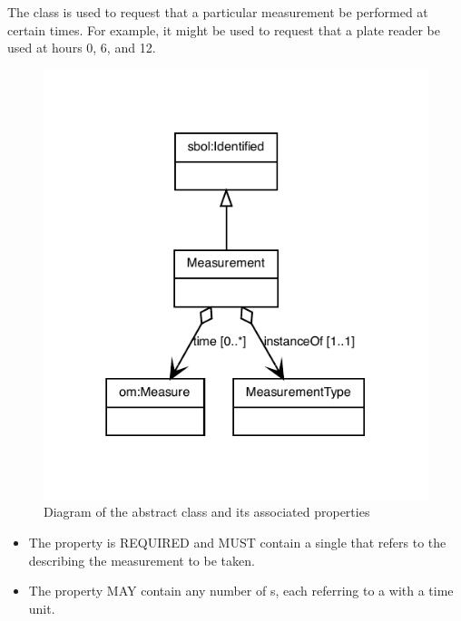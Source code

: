 The  class is used to request that a particular measurement be performed at certain times.
For example, it might be used to request that a plate reader be used at hours 0, 6, and 12.

\begin{figure}[ht]
\begin{center}
\includegraphics[scale=0.8]{figures/Measurement}
\caption[]{Diagram of the  abstract class and its associated properties}
\label{uml:Measurement}
\end{center}
\end{figure}

\begin{itemize}
\item \label{sec:M:instanceOf}
The  property is REQUIRED and MUST contain a single  that refers to the  describing the measurement to be taken.

\item \label{sec:time}
The  property MAY contain any number of s, each referring to a  with a time unit.
\end{itemize}





